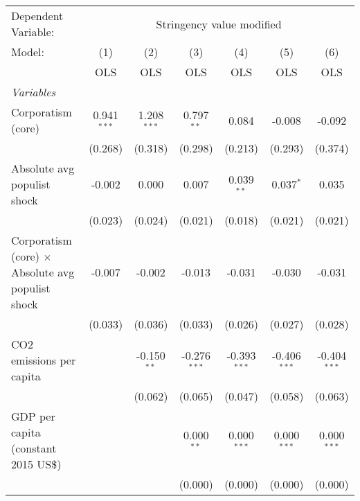 
\begingroup
\centering
\begin{tabular}{lcccccc}
   \toprule
   Dependent Variable: & \multicolumn{6}{c}{Stringency value modified}\\
   Model:                                                   & (1)           & (2)           & (3)            & (4)            & (5)            & (6)\\  
                                                            &  OLS          & OLS           & OLS            & OLS            & OLS            & OLS\\  
   \midrule
   \emph{Variables}\\
   Corporatism (core)                                       & 0.941$^{***}$ & 1.208$^{***}$ & 0.797$^{**}$   & 0.084          & -0.008         & -0.092\\   
                                                            & (0.268)       & (0.318)       & (0.298)        & (0.213)        & (0.293)        & (0.374)\\   
   Absolute avg populist shock                              & -0.002        & 0.000         & 0.007          & 0.039$^{**}$   & 0.037$^{*}$    & 0.035\\   
                                                            & (0.023)       & (0.024)       & (0.021)        & (0.018)        & (0.021)        & (0.021)\\   
   Corporatism (core) $\times$ Absolute avg populist shock  & -0.007        & -0.002        & -0.013         & -0.031         & -0.030         & -0.031\\   
                                                            & (0.033)       & (0.036)       & (0.033)        & (0.026)        & (0.027)        & (0.028)\\   
   CO2 emissions per capita                                 &               & -0.150$^{**}$ & -0.276$^{***}$ & -0.393$^{***}$ & -0.406$^{***}$ & -0.404$^{***}$\\   
                                                            &               & (0.062)       & (0.065)        & (0.047)        & (0.058)        & (0.063)\\   
   GDP per capita (constant 2015 US\$)                      &               &               & 0.000$^{**}$   & 0.000$^{***}$  & 0.000$^{***}$  & 0.000$^{***}$\\   
                                                            &               &               & (0.000)        & (0.000)        & (0.000)        & (0.000)\\   

\end{tabular}
